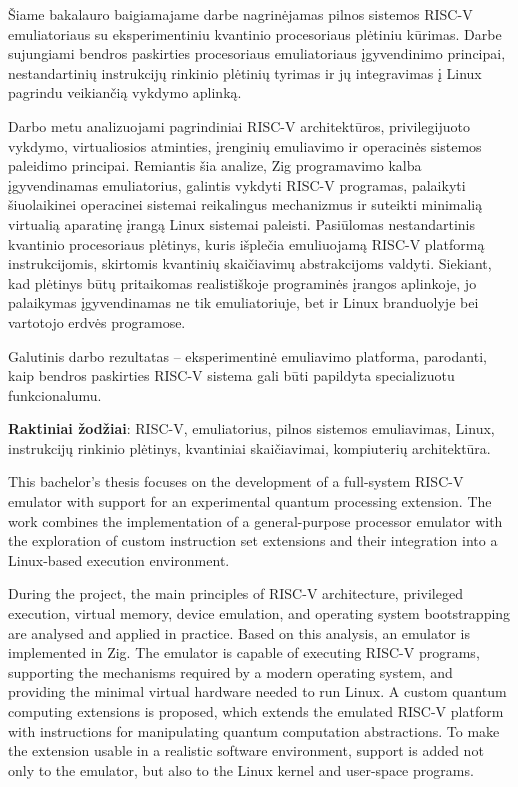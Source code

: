 Šiame bakalauro baigiamajame darbe nagrinėjamas pilnos sistemos RISC-V emuliatoriaus su eksperimentiniu kvantinio procesoriaus plėtiniu kūrimas. Darbe sujungiami bendros paskirties procesoriaus emuliatoriaus įgyvendinimo principai, nestandartinių instrukcijų rinkinio plėtinių tyrimas ir jų integravimas į Linux pagrindu veikiančią vykdymo aplinką.

Darbo metu analizuojami pagrindiniai RISC-V architektūros, privilegijuoto vykdymo, virtualiosios atminties, įrenginių emuliavimo ir operacinės sistemos paleidimo principai. Remiantis šia analize, Zig programavimo kalba įgyvendinamas emuliatorius, galintis vykdyti RISC-V programas, palaikyti šiuolaikinei operacinei sistemai reikalingus mechanizmus ir suteikti minimalią virtualią aparatinę įrangą Linux sistemai paleisti. Pasiūlomas nestandartinis kvantinio procesoriaus plėtinys, kuris išplečia emuliuojamą RISC-V platformą instrukcijomis, skirtomis kvantinių skaičiavimų abstrakcijoms valdyti. Siekiant, kad plėtinys būtų pritaikomas realistiškoje programinės įrangos aplinkoje, jo palaikymas įgyvendinamas ne tik emuliatoriuje, bet ir Linux branduolyje bei vartotojo erdvės programose.

Galutinis darbo rezultatas -- eksperimentinė emuliavimo platforma, parodanti, kaip bendros paskirties RISC-V sistema gali būti papildyta specializuotu funkcionalumu.

\vspace{1cm}
\textbf{Raktiniai žodžiai}: RISC-V, emuliatorius, pilnos sistemos emuliavimas, Linux, instrukcijų rinkinio plėtinys, kvantiniai skaičiavimai, kompiuterių architektūra.

This bachelor’s thesis focuses on the development of a full-system RISC-V emulator with support for an experimental quantum processing extension. The work combines the implementation of a general-purpose processor emulator with the exploration of custom instruction set extensions and their integration into a Linux-based execution environment.

During the project, the main principles of RISC-V architecture, privileged execution, virtual memory, device emulation, and operating system bootstrapping are analysed and applied in practice. Based on this analysis, an emulator is implemented in Zig. The emulator is capable of executing RISC-V programs, supporting the mechanisms required by a modern operating system, and providing the minimal virtual hardware needed to run Linux. A custom quantum computing extensions is proposed, which extends the emulated RISC-V platform with instructions for manipulating quantum computation abstractions. To make the extension usable in a realistic software environment, support is added not only to the emulator, but also to the Linux kernel and user-space programs.

